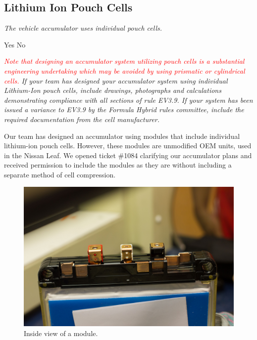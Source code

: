 \documentclass{article}
\begin{document}
\subsection{Lithium Ion Pouch Cells}

    \textit{The vehicle accumulator uses individual pouch cells. } \par                      \makebox[0pt][l]{$\square$}\raisebox{.15ex}{\hspace{0.1em}} \hspace{0.2cm} Yes
    \makebox[0pt][l]{$\square$}\raisebox{.15ex}{\hspace{0.1em}$\checkmark$} \hspace{0.2cm} No

    \textit{\textcolor{red}{Note that designing an accumulator system utilizing pouch cells is a substantial engineering undertaking which may be avoided by using prismatic or cylindrical cells.} If your team has designed your accumulator system using individual Lithium-Ion pouch cells, include drawings, photographs and calculations demonstrating compliance with all sections of rule EV3.9. If your system has been issued a variance to EV3.9 by the Formula Hybrid rules committee, include the required documentation from the cell manufacturer.}

    Our team has designed an accumulator using modules that include individual lithium-ion pouch cells. However, these modules are unmodified OEM units, used in the Nissan Leaf. We opened ticket \#1084 clarifying our accumulator plans and received permission to include the modules as they are without including a separate method of cell compression.

        \begin{figure}[H]
            \centering
            \includegraphics[width = 0.7 \textwidth]{OpenModule}
            \caption{Inside view of a module. }
            \label{canopener}
        \end{figure}
\end{document}
